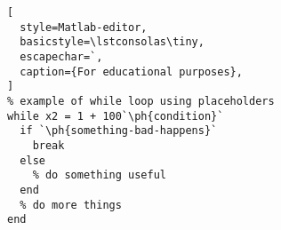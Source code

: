 \documentclass{book}
\newcommand\ph\mlplaceholder
\begin{document}
\lstlistoflistings



\begin{lstlisting}[
  style=Matlab-editor,
  basicstyle=\lstconsolas\tiny,
  escapechar=`,
  caption={For educational purposes},
]
% example of while loop using placeholders
while x2 = 1 + 100`\ph{condition}`
  if `\ph{something-bad-happens}`
    break
  else
    % do something useful
  end
  % do more things
end
\end{lstlisting}
\end{document}
